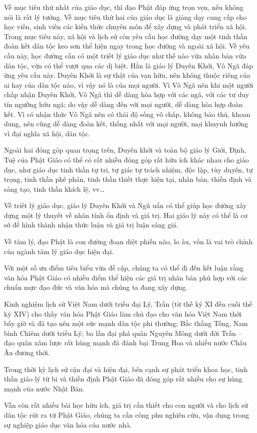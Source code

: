 Về mục tiêu thứ nhất của giáo dục, thì đạo Phật đáp ứng trọn vẹn, nếu không nói là rất lý tưởng. Về mục tiêu thứ hai của giáo dục là giảng dạy cung cấp cho học viên, sinh viên các kiến thức chuyên môn để xây dựng và phát triển xã hội. Trong mục tiêu này, xã hội và lịch sử còn yêu cầu học đường dạy một tinh thần đoàn kết dân tộc keo sơn thể hiện ngay trong học đường và ngoài xã hội. Về yêu cầu này, học đường cần có một triết lý giáo dục như thế nào vừa nhân bản vừa dân tộc, vừa có thể vượt qua các dị biệt. Hẳn là giáo lý Duyên Khởi, Vô Ngã đáp ứng yêu cầu này. Duyên Khởi là sự thật của vạn hữu, nên không thuộc riêng của ai hay của dân tộc nào, vì vậy nó là của mọi người. Vì Vô Ngã nên khi một người chấp nhận Duyên Khởi, Vô Ngã thì dễ dàng hòa hợp với các ngã, với các tư duy tín ngưỡng hữu ngã; do vậy dễ dàng đến với mọi người, dễ dàng hòa hợp đoàn kết. Vì có nhận thức Vô Ngã nên có thái độ sống vô chấp, không bảo thủ, khoan dung, nên cũng dễ dàng đoàn kết, thống nhất với mọi người, mọi khuynh hướng vì đại nghĩa xã hội, dân tộc.

Ngoài hai đóng góp quan trọng trên, Duyên khởi và toàn bộ giáo lý Giới, Định, Tuệ của Phật Giáo có thể có rất nhiều đóng góp rất hữu ích khác nhau cho giáo dục, như giáo dục tinh thần tự tri, tự giác tự trách nhiệm, độc lập, tùy duyên, tự trọng, tinh thần phê phán, tinh thần thiết thực hiện tại, nhân bản, thiền định và sáng tạo, tinh thần khích lệ, vv\ldots

Về triết lý giáo dục, giáo lý Duyên Khởi và Ngũ uẩn có thể giúp học đường xây dựng một lý thuyết về nhân tính ổn định và giá trị. Hai giáo lý này có thể là cơ sở để hình thành nhận thức luận và giá trị luận sáng giá.

Về tâm lý, đạo Phật là con đường đoạn diệt phiền não, lo âu, vốn là vai trò chính của ngành tâm lý giáo dục hiện đại.

Với một số ưu điểm tiêu biểu vừa đề cập, chúng ta có thể đi đến kết luận rằng văn hóa Phật Giáo có nhiều điểm thể hiện các giá trị nhân bản phù hợp với các chuẩn mực đạo đức và văn hóa mà chúng ta đang xây dựng.

Kinh nghiệm lịch sử Việt Nam dưới triều đại Lý, Trần (từ thế kỷ XI đến cuối thế kỷ XIV) cho thấy văn hóa Phật Giáo làm chủ đạo cho văn hóa Việt Nam thời bấy giờ và đã tạo nên một sức mạnh dân tộc phi thường; Bắc thắng Tống, Nam bình Chiêm dưới triều Lý; ba lần đại phá quân Nguyên Mông dưới đời Trần -- đạo quân xâm lược rất hùng mạnh đã đánh bại Trung Hoa và nhiều nước Châu Âu đương thời.

Trong thời kỳ lịch sử cận đại và hiện đại, bên cạnh sự phát triển khoa học, tinh thần giáo lý từ bi và thiền định Phật Giáo đã đóng góp rất nhiều cho sự hùng mạnh của nước Nhật Bản.

Vẫn còn rất nhiều bài học hữu ích, giá trị cần thiết cho con người và cho lịch sử dân tộc rút ra từ Phật Giáo, chúng ta cần công phu nghiên cứu, vận dụng trong sự nghiệp giáo dục văn hóa của nước nhà.

